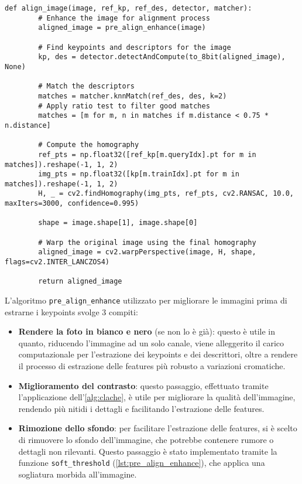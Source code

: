 \begin{lstlisting}[label={lst:single_alignment}]
    def align_image(image, ref_kp, ref_des, detector, matcher):
        # Enhance the image for alignment process
        aligned_image = pre_align_enhance(image)

        # Find keypoints and descriptors for the image
        kp, des = detector.detectAndCompute(to_8bit(aligned_image), None)

        # Match the descriptors
        matches = matcher.knnMatch(ref_des, des, k=2)
        # Apply ratio test to filter good matches
        matches = [m for m, n in matches if m.distance < 0.75 * n.distance]

        # Compute the homography
        ref_pts = np.float32([ref_kp[m.queryIdx].pt for m in matches]).reshape(-1, 1, 2)
        img_pts = np.float32([kp[m.trainIdx].pt for m in matches]).reshape(-1, 1, 2)
        H, _ = cv2.findHomography(img_pts, ref_pts, cv2.RANSAC, 10.0, maxIters=3000, confidence=0.995)

        shape = image.shape[1], image.shape[0]
        
        # Warp the original image using the final homography
        aligned_image = cv2.warpPerspective(image, H, shape, flags=cv2.INTER_LANCZOS4)

        return aligned_image
\end{lstlisting}

L'algoritmo \texttt{pre\_align\_enhance} utilizzato per migliorare le immagini prima di estrarne i keypoints svolge 3 compiti:

\begin{itemize}
    \item \textbf{Rendere la foto in bianco e nero} (se non lo è già): questo è utile in quanto, riducendo l'immagine ad un solo canale, viene alleggerito il carico computazionale per l'estrazione dei keypoints e dei descrittori, oltre a rendere il processo di estrazione delle features più robusto a variazioni cromatiche.
    
    \item \textbf{Miglioramento del contrasto}: questo passaggio, effettuato tramite l'applicazione dell'\cref{alg:clache}, è utile per migliorare la qualità dell'immagine, rendendo più nitidi i dettagli e facilitando l'estrazione delle features.
    
    \item \textbf{Rimozione dello sfondo}: per facilitare l'estrazione delle features, si è scelto di rimuovere lo sfondo dell'immagine, che potrebbe contenere rumore o dettagli non rilevanti. Questo passaggio è stato implementato tramite la funzione \texttt{soft\_threshold} (\cref{lst:pre_align_enhance}), che applica una sogliatura morbida all'immagine.
\end{itemize}

